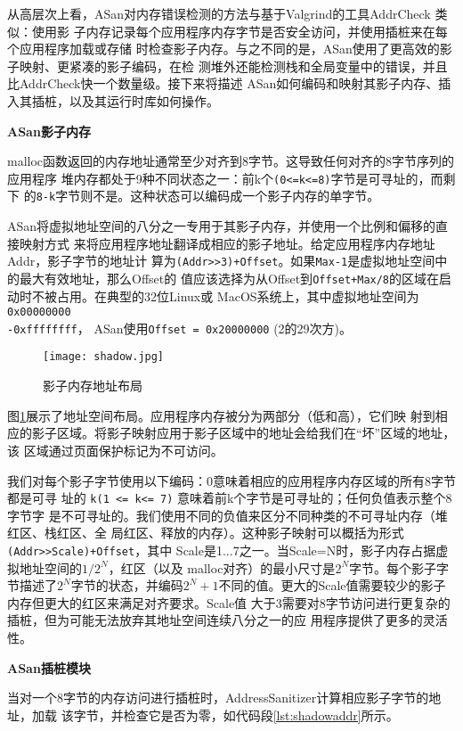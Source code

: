 从高层次上看，ASan对内存错误检测的方法与基于Valgrind的工具AddrCheck 类似：使用影
子内存记录每个应用程序内存字节是否安全访问，并使用插桩来在每个应用程序加载或存储
时检查影子内存。与之不同的是，ASan使用了更高效的影子映射、更紧凑的影子编码，在检
测堆外还能检测栈和全局变量中的错误，并且比AddrCheck快一个数量级。接下来将描述
ASan如何编码和映射其影子内存、插入其插桩，以及其运行时库如何操作。

\textbf{ASan影子内存}

malloc函数返回的内存地址通常至少对齐到8字节。这导致任何对齐的8字节序列的应用程序
堆内存都处于9种不同状态之一：前k个\texttt{(0<=k<=8)}字节是可寻址的，而剩下
的\texttt{8-k}字节则不是。这种状态可以编码成一个影子内存的单字节。

ASan将虚拟地址空间的八分之一专用于其影子内存，并使用一个比例和偏移的直接映射方式
来将应用程序地址翻译成相应的影子地址。给定应用程序内存地址Addr，影子字节的地址计
算为\texttt{(Addr>>3)+Offset}。如果\texttt{Max-1}是虚拟地址空间中的最大有效地址，那么Offset的
值应该选择为从Offset到\texttt{Offset+Max/8}的区域在启动时不被占用。在典型的32位Linux或
MacOS系统上，其中虚拟地址空间为\texttt{0x00000000\\-0xffffffff}， ASan使用\texttt{Offset =
0x20000000} (2的29次方)。
\begin{figure}[H]
	\centering
	\texttt{[image: shadow.jpg]}
	\caption{影子内存地址布局}
	\label{fig:shadow}
\end{figure}

图\ref{fig:shadow}展示了地址空间布局。应用程序内存被分为两部分（低和高），它们映
射到相应的影子区域。将影子映射应用于影子区域中的地址会给我们在“坏”区域的地址，该
区域通过页面保护标记为不可访问。

我们对每个影子字节使用以下编码：0意味着相应的应用程序内存区域的所有8字节都是可寻
址的 \texttt{k(1 <= k<= 7)} 意味着前k个字节是可寻址的；任何负值表示整个8字节字
是不可寻址的。我们使用不同的负值来区分不同种类的不可寻址内存（堆红区、栈红区、全
局红区、释放的内存）。这种影子映射可以概括为形式\texttt{(Addr>>Scale)+Offset}，其中
Scale是1...7之一。当Scale=N时，影子内存占据虚拟地址空间的$1/2^N$，红区（以及
malloc对齐）的最小尺寸是$2^N$字节。每个影子字节描述了$2^N$字节的状态，并编码$2^N
+1$不同的值。更大的Scale值需要较少的影子内存但更大的红区来满足对齐要求。Scale值
大于3需要对8字节访问进行更复杂的插桩，但为可能无法放弃其地址空间连续八分之一的应
用程序提供了更多的灵活性。

\textbf{ASan插桩模块}

当对一个8字节的内存访问进行插桩时，AddressSanitizer计算相应影子字节的地址，加载
该字节，并检查它是否为零，如代码段\ref{lst:shadowaddr}所示。

